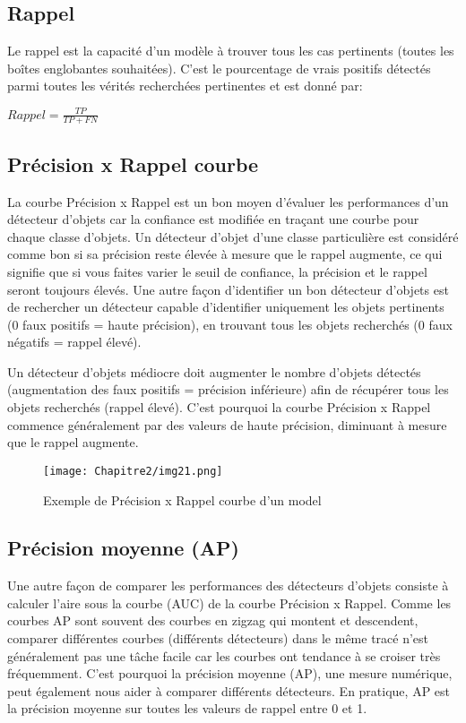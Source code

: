           \subsection{Rappel}
          Le rappel est la capacité d'un modèle à trouver tous les cas pertinents (toutes les boîtes englobantes souhaitées). C'est le pourcentage de vrais positifs détectés parmi toutes les vérités recherchées pertinentes et est donné par:
          \begin{center} $Rappel = \frac{TP}{TP + FN}$ \end{center}
          
          \subsection{Précision x Rappel courbe}
          La courbe Précision x Rappel est un bon moyen d'évaluer les performances d'un détecteur d'objets car la confiance est modifiée en traçant une courbe pour chaque classe d'objets. Un détecteur d'objet d'une classe particulière est considéré comme bon si sa précision reste élevée à mesure que le rappel augmente, ce qui signifie que si vous faites varier le seuil de confiance, la précision et le rappel seront toujours élevés. Une autre façon d'identifier un bon détecteur d'objets est de rechercher un détecteur capable d'identifier uniquement les objets pertinents (0 faux positifs = haute précision), en trouvant tous les objets recherchés (0 faux négatifs = rappel élevé).
          
          Un détecteur d'objets médiocre doit augmenter le nombre d'objets détectés (augmentation des faux positifs = précision inférieure) afin de récupérer tous les objets recherchés (rappel élevé). C'est pourquoi la courbe Précision x Rappel commence généralement par des valeurs de haute précision, diminuant à mesure que le rappel augmente.
          \begin{figure}[H]
               \centering
               \texttt{[image: Chapitre2/img21.png]}
               \caption{Exemple de Précision x Rappel courbe d'un model}
               \label{img21}
               \end{figure}
          
          \subsection{Précision moyenne (AP)}
          Une autre façon de comparer les performances des détecteurs d'objets consiste à calculer l'aire sous la courbe (AUC) de la courbe Précision x Rappel. Comme les courbes AP sont souvent des courbes en zigzag qui montent et descendent, comparer différentes courbes (différents détecteurs) dans le même tracé n'est généralement pas une tâche facile car les courbes ont tendance à se croiser très fréquemment. C'est pourquoi la précision moyenne (AP), une mesure numérique, peut également nous aider à comparer différents détecteurs. En pratique, AP est la précision moyenne sur toutes les valeurs de rappel entre 0 et 1.
          
